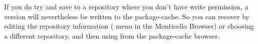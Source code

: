 \documentclass[a4paper,10pt,twoside]{book}
\begin{document}
If you do try and save to a repository where you don't have write permission, a version will nevertheless be written to the package-cache.  
So you can recover by editing the repository information ( menu in the Monticello Browser) or choosing a different repository, and then using  from the package-cache browser.

\begin{comment}
\subsection{Advanced Monticello} %

Monticello provides some quite sophisticated features for managing versions.
\ab{I've no idea what these things are.}

\damien{Moved from FirstApp where it was too complicated: A good trick
  is to always develop in the same folder. This way you get a copy of
  all the code that you publish on squeaksource on your local
  machine. You can then backup and browse at will.

}
\subsubsection{Scripts}

\subsubsection{Backporting}

\subsubsection{Differences}

\subsubsection{Adopting a new ancestor}

\subsubsection{Setting dependencies}

\subsubsection{Nested packages}


\end{comment}
\end{document}
